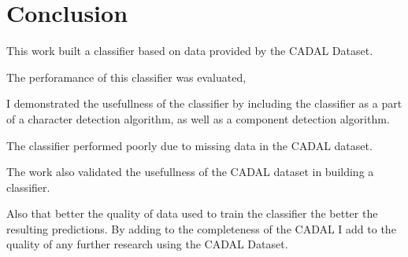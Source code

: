 \chapter{Conclusion}

This work built a classifier based on data provided by the CADAL Dataset.

The perforamance of this classifier was evaluated,

I demonstrated the usefullness of the classifier by including the classifier as a part of a character detection algorithm, as well as a component detection algorithm.

The classifier performed poorly due to missing data in the CADAL dataset. 



The work also validated the usefullness of the CADAL dataset in building a classifier.

Also that better the quality of data used to train the classifier the better the resulting predictions.  By adding to the completeness of the CADAL I add to the quality of any further research using the CADAL Dataset.

